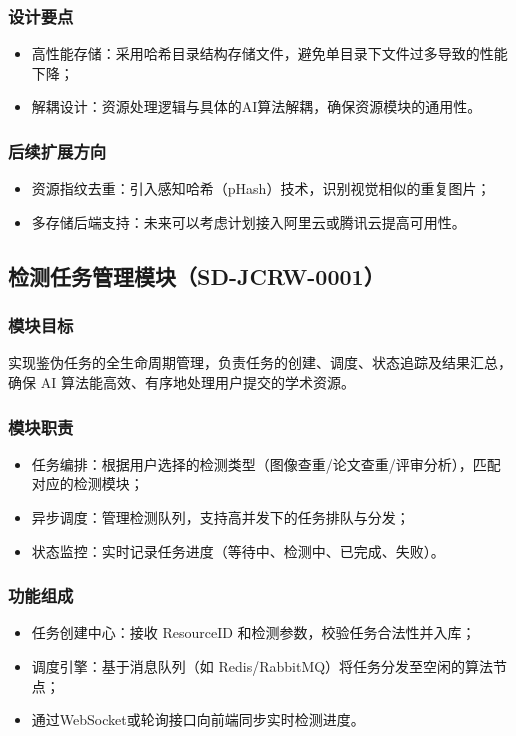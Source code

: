 \subsubsection{设计要点}
\begin{itemize}[leftmargin=2em]
    \item 高性能存储：采用哈希目录结构存储文件，避免单目录下文件过多导致的性能下降；
    \item 解耦设计：资源处理逻辑与具体的AI算法解耦，确保资源模块的通用性。
\end{itemize}

\subsubsection{后续扩展方向}
\begin{itemize}[leftmargin=2em]
    \item 资源指纹去重：引入感知哈希（pHash）技术，识别视觉相似的重复图片；
    \item 多存储后端支持：未来可以考虑计划接入阿里云或腾讯云提高可用性。
\end{itemize}

\subsection{检测任务管理模块（SD-JCRW-0001）}

\subsubsection{模块目标}
实现鉴伪任务的全生命周期管理，负责任务的创建、调度、状态追踪及结果汇总，确保 AI 算法能高效、有序地处理用户提交的学术资源。

\subsubsection{模块职责}
\begin{itemize}[leftmargin=2em]
    \item 任务编排：根据用户选择的检测类型（图像查重/论文查重/评审分析），匹配对应的检测模块；
    \item 异步调度：管理检测队列，支持高并发下的任务排队与分发；
    \item 状态监控：实时记录任务进度（等待中、检测中、已完成、失败）。
\end{itemize}

\subsubsection{功能组成}
\begin{itemize}[leftmargin=2em]
    \item 任务创建中心：接收 ResourceID 和检测参数，校验任务合法性并入库；
    \item 调度引擎：基于消息队列（如 Redis/RabbitMQ）将任务分发至空闲的算法节点；
    \item 通过WebSocket或轮询接口向前端同步实时检测进度。
\end{itemize}

